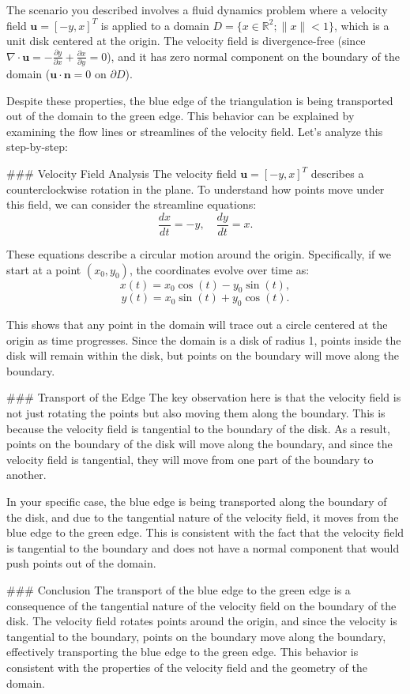 The scenario you described involves a fluid dynamics problem where a velocity field \( \mathbf{u} = [-y, x]^T \) is applied to a domain \( D = \{ x \in \mathbb{R}^2 ; \|x\| < 1 \} \), which is a unit disk centered at the origin. The velocity field is divergence-free (since \( \nabla \cdot \mathbf{u} = -\frac{\partial y}{\partial x} + \frac{\partial x}{\partial y} = 0 \)), and it has zero normal component on the boundary of the domain (\( \mathbf{u} \cdot \mathbf{n} = 0 \) on \( \partial D \)).

Despite these properties, the blue edge of the triangulation is being transported out of the domain to the green edge. This behavior can be explained by examining the flow lines or streamlines of the velocity field. Let's analyze this step-by-step:

### Velocity Field Analysis
The velocity field \( \mathbf{u} = [-y, x]^T \) describes a counterclockwise rotation in the plane. To understand how points move under this field, we can consider the streamline equations:
\[ \frac{dx}{dt} = -y, \quad \frac{dy}{dt} = x. \]

These equations describe a circular motion around the origin. Specifically, if we start at a point \( (x_0, y_0) \), the coordinates evolve over time as:
\[ x(t) = x_0 \cos(t) - y_0 \sin(t), \]
\[ y(t) = x_0 \sin(t) + y_0 \cos(t). \]

This shows that any point in the domain will trace out a circle centered at the origin as time progresses. Since the domain is a disk of radius 1, points inside the disk will remain within the disk, but points on the boundary will move along the boundary.

### Transport of the Edge
The key observation here is that the velocity field is not just rotating the points but also moving them along the boundary. This is because the velocity field is tangential to the boundary of the disk. As a result, points on the boundary of the disk will move along the boundary, and since the velocity field is tangential, they will move from one part of the boundary to another.

In your specific case, the blue edge is being transported along the boundary of the disk, and due to the tangential nature of the velocity field, it moves from the blue edge to the green edge. This is consistent with the fact that the velocity field is tangential to the boundary and does not have a normal component that would push points out of the domain.

### Conclusion
The transport of the blue edge to the green edge is a consequence of the tangential nature of the velocity field on the boundary of the disk. The velocity field rotates points around the origin, and since the velocity is tangential to the boundary, points on the boundary move along the boundary, effectively transporting the blue edge to the green edge. This behavior is consistent with the properties of the velocity field and the geometry of the domain.